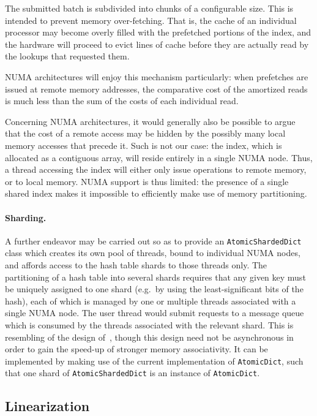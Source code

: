 The submitted batch is subdivided into chunks of a configurable size.
This is intended to prevent memory over-fetching.
That is, the cache of an individual processor may become overly filled with the prefetched portions of the index, and the hardware will proceed to evict lines of cache before they are actually read by the lookups that requested them.

NUMA architectures will enjoy this mechanism particularly: when prefetches are issued at remote memory addresses, the comparative cost of the amortized reads is much less than the sum of the costs of each individual read.

Concerning NUMA architectures, it would generally also be possible to argue that the cost of a remote access may be hidden by the possibly many local memory accesses that precede it.
Such is not our case: the index, which is allocated as a contiguous array, will reside entirely in a single NUMA node.
Thus, a thread accessing the index will either only issue operations to remote memory, or to local memory.
NUMA support is thus limited: the presence of a single shared index makes it impossible to efficiently make use of memory partitioning.

\paragraph{Sharding.}
A further endeavor may be carried out so as to provide an \texttt{Atomic\-ShardedDict} class which creates its own pool of threads, bound to individual NUMA nodes, and affords access to the hash table shards to those threads only.
The partitioning of a hash table into several shards requires that any given key must be uniquely assigned to one shard (e.g.\ by using the least-significant bits of the hash), each of which is managed by one or multiple threads associated with a single NUMA node.
The user thread would submit requests to a message queue which is consumed by the threads associated with the relevant shard.
This is resembling of the design of~\cite{dramhit}, though this design need not be asynchronous in order to gain the speed-up of stronger memory associativity.
It can be implemented by making use of the current implementation of \texttt{AtomicDict}, such that one shard of \texttt{AtomicShardedDict} is an instance of \texttt{AtomicDict}.

\subsection{Linearization}\label{subsec:batch-lookup-linearization}

